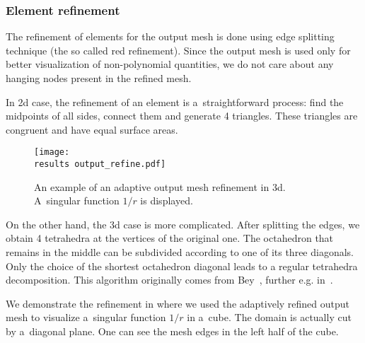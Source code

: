 \subsubsection{Element refinement}
\label{sec:element_refinement}
The refinement of elements for the output mesh is done using edge splitting technique (the so called red refinement).
Since the output mesh is used only for better visualization of non-polynomial quantities, we do not
care about any hanging nodes present in the refined mesh.

In 2d case, the refinement of an element is a~straightforward process: find the midpoints of all sides, connect them and generate 4 triangles.
These triangles are congruent and have equal surface areas.
%
\begin{figure}[!htb]
    \centering    
    \texttt{[image: \\results output\_refine.pdf]} 
    \caption[Output mesh refinement.]
  {An example of an adaptive output mesh refinement in 3d.
  A~singular function $1/r$ is displayed.}
  \label{fig:output_refinement_flow123d}
\end{figure}
%
On the other hand, the 3d case is more complicated. After splitting the edges, we obtain 4 tetrahedra at the vertices
of the original one. The octahedron that remains in the middle can be subdivided according to one of its three diagonals.
Only the choice of the shortest octahedron diagonal leads to a regular tetrahedra decomposition.
This algorithm originally comes from Bey~\cite{bey_2000}, further e.g. in~\cite{brandts_2011}.

We demonstrate the refinement in  where we used the adaptively refined output mesh to
visualize a~singular function $1/r$ in a~cube. The domain is actually cut by a~diagonal plane. One can see the mesh edges in
the left half of the cube.








